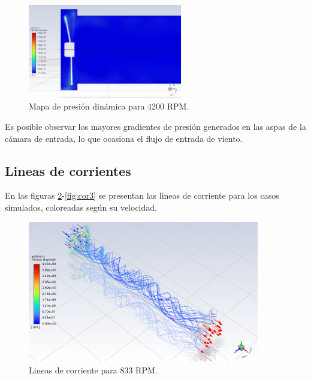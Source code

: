 \begin{figure}[!ht]
    \centering
    \includegraphics[width=0.6\textwidth]{images/dyn3.png}
    \caption{Mapa de presión dinámica para 4200 RPM.}
    \label{fig:dyn3}
\end{figure}

Es posible observar los mayores gradientes de presión generados en las aspas de la cámara de entrada, lo que ocasiona el flujo de entrada de viento.

\newpage
\subsection{Lineas de corrientes}

En las figuras \ref{fig:cor1}-\ref{fig:cor3} se presentan las lineas de corriente para los casos simulados, coloreadas según su velocidad.

\begin{figure}[ht!]
    \centering
    \includegraphics[width=0.9\textwidth]{images/cor1.png}
    \caption{Lineas de corriente para 833 RPM.}
    \label{fig:cor1}
\end{figure}


